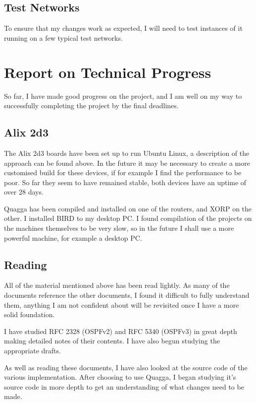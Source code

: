 \documentclass[12pt]{report}
\begin{document}
\section{Test Networks}
To ensure that my changes work as expected, I will need to test instances of it
running on a few typical test networks. 


\chapter{Report on Technical Progress}
So far, I have made good progress on the project, and I am well on my way to
successfully completing the project by the final deadlines.


\section{Alix 2d3}
The Alix 2d3 boards have been set up to run Ubuntu Linux, a description of the
approach can be found above. In the future it may be necessary to create a more
customised build for these devices, if for example I find the performance to be
poor. So far they seem to have remained stable, both devices have an uptime of
over 28 days.

Quagga has been compiled and installed on one of the routers, and XORP on the
other. I installed BIRD to my desktop PC.  I found compilation of the projects on the machines themselves to be
very slow, so in the future I shall use a more powerful machine, for example a
desktop PC.

\section{Reading}
All of the material mentioned above has been read lightly. As many of the
documents reference the other documents, I found it difficult to fully
understand them, anything I am not confident about will be revisited once I have
a more solid foundation.

I have studied RFC 2328 (OSPFv2) and RFC 5340 (OSPFv3) in great depth making
detailed notes of their contents. I have also begun studying the appropriate
drafts.

As well as reading these documents, I have also looked at the source code of the
various implementation. After choosing to use Quagga, I began studying it's
source code in more depth to get an understanding of what changes need to be
made. 
\end{document}
